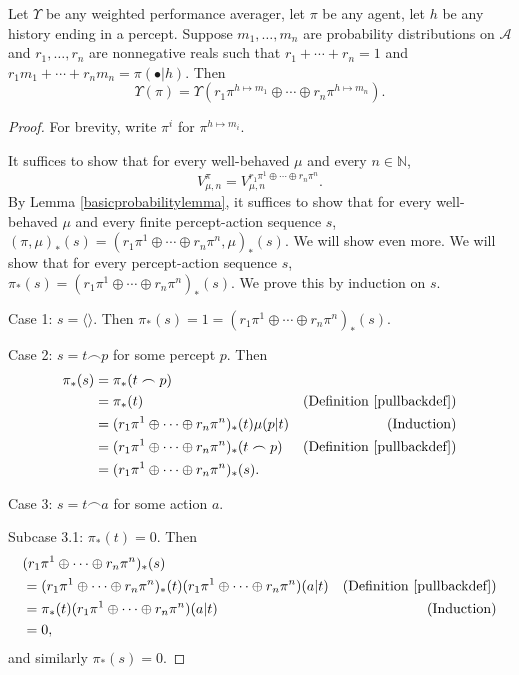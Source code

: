\documentclass[runningheads]{llncs}
\begin{document}
\begin{proposition}
\label{longproposition}
    Let $\Upsilon$ be any weighted performance averager, let $\pi$ be any agent,
    let $h$ be any history ending in a percept.
    Suppose $m_1,\ldots,m_n$ are probability distributions on $\mathcal A$
    and $r_1,\ldots,r_n$ are nonnegative reals such that $r_1+\cdots+r_n=1$
    and $r_1m_1+\cdots+r_nm_n=\pi(\bullet|h)$.
    Then
    \[
        \Upsilon(\pi)
        =
        \Upsilon(r_1\pi^{h\mapsto m_1} \oplus \cdots \oplus r_n\pi^{h\mapsto m_n}).
    \]
\end{proposition}

\begin{proof}
    For brevity, write $\pi^i$ for $\pi^{h\mapsto m_i}$.

    It suffices to show that for every well-behaved $\mu$ and every $n\in\mathbb N$,
    \[
        V^{\pi}_{\mu,n}
        =
        V^{r_1\pi^1 \oplus \cdots \oplus r_n\pi^n}_{\mu,n}.
    \]
    By Lemma \ref{basicprobabilitylemma}, it suffices to show that for every
    well-behaved $\mu$ and every finite percept-action sequence $s$,
    $
    (\pi,\mu)_*(s)
    =
    (r_1\pi^1 \oplus \cdots \oplus r_n\pi^n,\mu)_*(s)
    $.
    We will show even more. We will show that for every percept-action sequence
    $s$, $\pi_*(s)=(r_1\pi^1 \oplus \cdots \oplus r_n\pi^n)_*(s)$.
    We prove this by induction on $s$.

    Case 1: $s=\langle\rangle$.
    Then $\pi_*(s)=1
    =(r_1\pi^1 \oplus \cdots \oplus r_n\pi^n)_*(s)$.

    Case 2: $s=t\frown p$ for some percept $p$.
    Then
    \begin{align*}
        \pi_*(s)
            &= \pi_*(t\frown p)\\
            &= \pi_*(t)
                &\mbox{(Definition \ref{pullbackdef})}\\
            &= (r_1\pi^1 \oplus \cdots \oplus r_n\pi^n)_*(t)\mu(p|t)
                &\mbox{(Induction)}\\
            &= (r_1\pi^1 \oplus \cdots \oplus r_n\pi^n)_*(t\frown p)
                &\mbox{(Definition \ref{pullbackdef})}\\
            &= (r_1\pi^1 \oplus \cdots \oplus r_n\pi^n)_*(s).
    \end{align*}

    Case 3: $s=t\frown a$ for some action $a$.

    Subcase 3.1: $\pi_*(t)=0$.
    Then
    \begin{align*}
        &{} (r_1\pi^1\oplus\cdots\oplus r_n\pi^n)_*(s)\\
            &= (r_1\pi^1\oplus\cdots\oplus r_n\pi^n)_*(t)
            (r_1\pi^1\oplus\cdots\oplus r_n\pi^n)(a|t)
                &\mbox{(Definition \ref{pullbackdef})}\\
            &= \pi_*(t)(r_1\pi^1\oplus\cdots\oplus r_n\pi^n)(a|t)
                &\mbox{(Induction)}\\
            &= 0,
    \end{align*}
    and similarly $\pi_*(s)=0$.


\end{proof}
\end{document}
